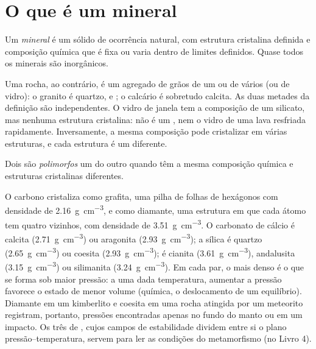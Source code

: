 \section{O que é um mineral}

\begin{definition}[Mineral]\label{def:b1:rock-forming-minerals:mineral}
Um \emph{mineral} é um sólido de ocorrência natural, com estrutura cristalina definida e composição química que é fixa ou varia dentro de limites definidos. Quase todos os minerais são inorgânicos.
\end{definition}

Uma rocha, ao contrário, é um agregado de grãos de um ou de vários  (ou de vidro): o granito é quartzo,  e ; o calcário é sobretudo calcita. As duas metades da definição são independentes. O vidro de janela tem a composição de um silicato, mas nenhuma estrutura cristalina: não é um , nem o vidro de uma lava resfriada rapidamente. Inversamente, a mesma composição pode cristalizar em várias estruturas, e cada estrutura é um  diferente.

\begin{definition}[Polimorfo]\label{def:b1:rock-forming-minerals:polymorph}
Dois  são \emph{polimorfos} um do outro quando têm a mesma composição química e estruturas cristalinas diferentes.
\end{definition}

O carbono cristaliza como grafita, uma pilha de folhas de hexágonos com densidade de \qty{2.16}{g.cm^{-3}}, e como diamante, uma estrutura em que cada átomo tem quatro vizinhos, com densidade de \qty{3.51}{g.cm^{-3}}. O carbonato de cálcio é calcita (\qty{2.71}{g.cm^{-3}}) ou aragonita (\qty{2.93}{g.cm^{-3}}); a sílica é quartzo (\qty{2.65}{g.cm^{-3}}) ou coesita (\qty{2.93}{g.cm^{-3}});  é cianita (\qty{3.61}{g.cm^{-3}}), andalusita (\qty{3.15}{g.cm^{-3}}) ou silimanita (\qty{3.24}{g.cm^{-3}}).
Em cada par, o  mais denso é o que se forma sob maior pressão: a uma dada temperatura, aumentar a pressão favorece o estado de menor volume (química, o deslocamento de um equilíbrio). Diamante em um kimberlito e coesita em uma rocha atingida por um meteorito registram, portanto, pressões encontradas apenas no fundo do manto ou em um impacto. Os três  de , cujos campos de estabilidade dividem entre si o plano pressão--temperatura, servem para ler as condições do metamorfismo (no Livro 4).

